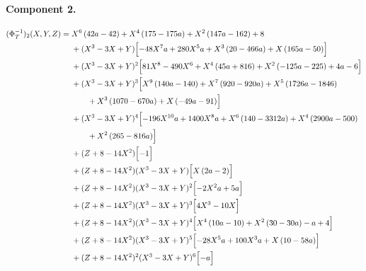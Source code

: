 \paragraph{Component 2.}
\begingroup
\footnotesize
\allowdisplaybreaks[0]
\begin{align*}
(\Phi_T^{-1})_2(X,Y,Z)={}&X^{6} \left(42 a - 42\right) + X^{4} \left(175 - 175 a\right) + X^{2} \left(147 a - 162\right) + 8\\
&{}+(X^3-3X+Y)\Bigl[- 48 X^{7} a + 280 X^{5} a + X^{3} \left(20 - 466 a\right) + X \left(165 a - 50\right)\Bigr]\\
&{}+(X^3-3X+Y)^{2}\Bigl[81 X^{8} - 490 X^{6} + X^{4} \left(45 a + 816\right) + X^{2} \left(- 125 a - 225\right) + 4 a - 6\Bigr]\\
&{}+(X^3-3X+Y)^{3}\Bigl[X^{9} \left(140 a - 140\right) + X^{7} \left(920 - 920 a\right) + X^{5} \left(1726 a - 1846\right)\\
&\qquad + X^{3} \left(1070 - 670 a\right) + X \left(- 49 a - 91\right)\Bigr]\\
&{}+(X^3-3X+Y)^{4}\Bigl[- 196 X^{10} a + 1400 X^{8} a + X^{6} \left(140 - 3312 a\right) + X^{4} \left(2900 a - 500\right)\\
&\qquad + X^{2} \left(265 - 816 a\right)\Bigr]\\
&{}+(Z+8-14X^2)\Bigl[- 1\Bigr]\\
&{}+(Z+8-14X^2)(X^3-3X+Y)\Bigl[X \left(2 a - 2\right)\Bigr]\\
&{}+(Z+8-14X^2)(X^3-3X+Y)^{2}\Bigl[- 2 X^{2} a + 5 a\Bigr]\\
&{}+(Z+8-14X^2)(X^3-3X+Y)^{3}\Bigl[4 X^{3} - 10 X\Bigr]\\
&{}+(Z+8-14X^2)(X^3-3X+Y)^{4}\Bigl[X^{4} \left(10 a - 10\right) + X^{2} \left(30 - 30 a\right) - a + 4\Bigr]\\
&{}+(Z+8-14X^2)(X^3-3X+Y)^{5}\Bigl[- 28 X^{5} a + 100 X^{3} a + X \left(10 - 58 a\right)\Bigr]\\
&{}+(Z+8-14X^2)^{2}(X^3-3X+Y)^{6}\Bigl[- a\Bigr]
\end{align*}
\endgroup

